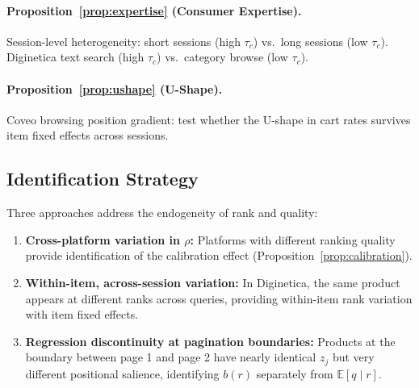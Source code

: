 \documentclass[12pt]{article}
\begin{document}
\paragraph{Proposition~\ref{prop:expertise} (Consumer Expertise).}
Session-level heterogeneity: short sessions (high $\tau_c$) vs.\ long sessions (low $\tau_c$). Diginetica text search (high $\tau_c$) vs.\ category browse (low $\tau_c$).

\paragraph{Proposition~\ref{prop:ushape} (U-Shape).}
Coveo browsing position gradient: test whether the U-shape in cart rates survives item fixed effects across sessions.

\subsection{Identification Strategy}

Three approaches address the endogeneity of rank and quality:
\begin{enumerate}
    \item \textbf{Cross-platform variation in $\rho$:} Platforms with different ranking quality provide identification of the calibration effect (Proposition~\ref{prop:calibration}).
    \item \textbf{Within-item, across-session variation:} In Diginetica, the same product appears at different ranks across queries, providing within-item rank variation with item fixed effects.
    \item \textbf{Regression discontinuity at pagination boundaries:} Products at the boundary between page 1 and page 2 have nearly identical $z_j$ but very different positional salience, identifying $b(r)$ separately from $\mathbb{E}[q \mid r]$.
\end{enumerate}
\end{document}
